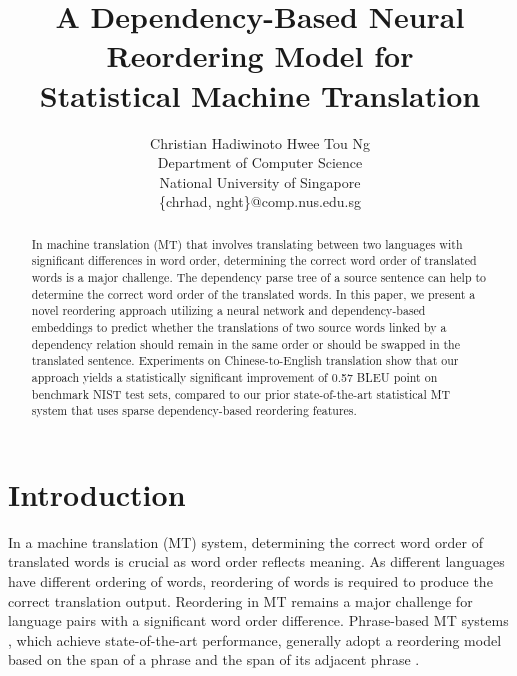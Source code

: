 \documentclass[letterpaper]{article}
\begin{document}
%
\title{A Dependency-Based Neural Reordering Model for \\Statistical Machine Translation}
\author{Christian Hadiwinoto \hspace{1cm} Hwee Tou Ng \\
Department of Computer Science \\
National University of Singapore \\
\{chrhad, nght\}@comp.nus.edu.sg\\
}
\maketitle
\begin{abstract}
In machine translation (MT) that involves translating between two languages with significant differences in word order, determining the correct word order of translated words is a major challenge. The dependency parse tree of a source sentence can help to determine the correct word order of the translated words.  In this paper, we present a novel reordering approach utilizing a neural network and dependency-based embeddings to predict whether the translations of two source words linked by a dependency relation should remain in the same order or should be swapped in the translated sentence. Experiments on Chinese-to-English translation show that our approach yields a statistically significant improvement of 0.57 BLEU point on benchmark NIST test sets, compared to our prior state-of-the-art statistical MT system that uses sparse dependency-based reordering features.
\end{abstract}

\section{Introduction}
In a machine translation (MT) system, determining the correct word order of translated words is crucial as word order reflects meaning. As different languages have different ordering of words, reordering of words is required to produce the correct translation output. Reordering in MT remains a major challenge for language pairs with a significant word order difference. Phrase-based MT systems \cite{koehn_statistical_2003}, which achieve state-of-the-art performance, generally adopt a reordering model based on the span of a phrase and the span of its adjacent phrase \cite{tillmann_unigram_2004,koehn_edinburgh_2005,galley_simple_2008}.
\end{document}
